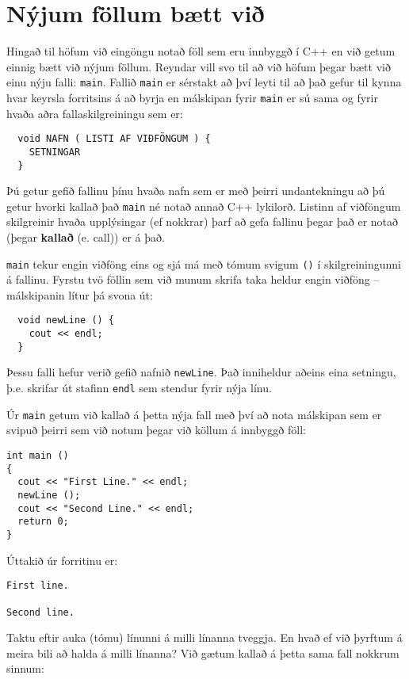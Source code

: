 \section{Nýjum föllum bætt við}

Hingað til höfum við eingöngu notað föll sem eru innbyggð í C++ en við getum einnig bætt við nýjum föllum.
Reyndar vill svo til að við höfum þegar bætt við einu nýju falli: {\tt main}.
Fallið {\tt main} er sérstakt að því leyti til að það gefur til kynna hvar keyrsla forritsins á að byrja en málskipan fyrir {\tt main} er sú sama og fyrir hvaða aðra fallaskilgreiningu sem er:

\begin{verbatim}
  void NAFN ( LISTI AF VIÐFÖNGUM ) {
    SETNINGAR
  }
\end{verbatim}
%
Þú getur gefið fallinu þínu hvaða nafn sem er með þeirri undantekningu að þú getur hvorki kallað það 
{\tt main} né notað annað C++ lykilorð.
Listinn af viðföngum skilgreinir hvaða upplýsingar (ef nokkrar) þarf að gefa fallinu þegar það er notað (þegar {\bf kallað} (e. call)) er á það.

{\tt main} tekur engin viðföng eins og sjá má með tómum svigum {\tt ()} í skilgreiningunni á fallinu.
Fyrstu tvö föllin sem við munum skrifa taka heldur engin viðföng -- málskipanin lítur þá svona út:

\begin{verbatim}
  void newLine () {
    cout << endl;
  }
\end{verbatim}
%
Þessu falli hefur verið gefið nafnið {\tt newLine}.
Það inniheldur aðeins eina setningu, þ.e. skrifar út stafinn {\tt endl} sem stendur fyrir nýja línu.

Úr {\tt main} getum við kallað á þetta nýja fall með því að nota málskipan sem er svipuð þeirri sem við notum þegar við köllum á innbyggð föll:

\begin{verbatim}
int main ()
{
  cout << "First Line." << endl;
  newLine ();
  cout << "Second Line." << endl;
  return 0;
}
\end{verbatim}
%
Úttakið úr forritinu er:

\begin{verbatim}
First line.

Second line.
\end{verbatim}
%
Taktu eftir auka (tómu) línunni á milli línanna tveggja.
En hvað ef við þyrftum á meira bili að halda á milli línanna?
Við gætum kallað á þetta sama fall nokkrum sinnum:

